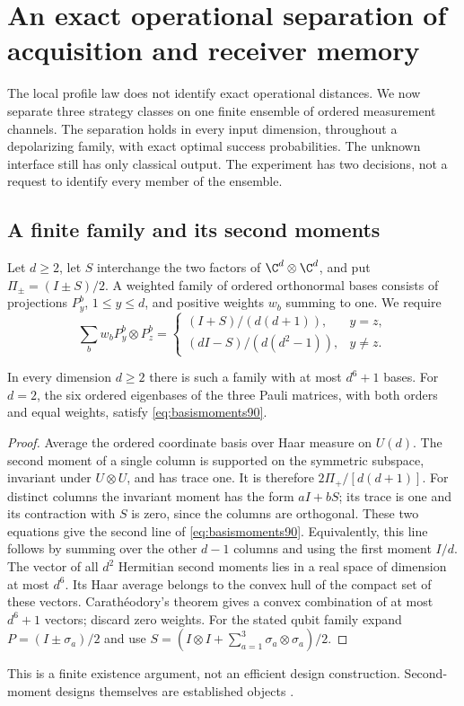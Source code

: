 \section{An exact operational separation of acquisition and receiver memory}
\label{sec:operationalmemory90}
The local profile law does not identify exact operational distances.
We now separate three strategy classes on one finite ensemble of ordered
measurement channels.  The separation holds in every input dimension,
throughout a depolarizing family, with exact optimal success probabilities.
The unknown interface still has only classical output.  The experiment
has two decisions, not a request to identify every member of the ensemble.

\subsection{A finite family and its second moments}
Let $d\ge2$, let $S$ interchange the two factors of $\C^d\otimes\C^d$,
and put $\Pi_\pm=(I\pm S)/2$.  A weighted family of ordered orthonormal
bases consists of projections $P_y^b$, $1\le y\le d$, and positive
weights $w_b$ summing to one.  We require
\begin{equation}\label{eq:basismoments90}
 \sum_b w_b P_y^b\otimes P_z^b=
 \begin{cases}
 (I+S)/(d(d+1)),&y=z,\\
 (dI-S)/(d(d^2-1)),&y\ne z.
 \end{cases}
\end{equation}
\begin{lemma}\label{lem:finitedesign90}
In every dimension $d\ge2$ there is such a family with at most $d^6+1$
bases.  For $d=2$, the six ordered eigenbases of the three Pauli matrices,
with both orders and equal weights, satisfy \eqref{eq:basismoments90}.
\end{lemma}
\begin{proof}
Average the ordered coordinate basis over Haar measure on $U(d)$.
The second moment of a single column is supported on the symmetric
subspace, invariant under $U\otimes U$, and has trace one.  It is
therefore $2\Pi_+/[d(d+1)]$.  For distinct columns the invariant moment
has the form $aI+bS$; its trace is one and its contraction with $S$ is
zero, since the columns are orthogonal.  These two equations give the
second line of \eqref{eq:basismoments90}.  Equivalently, this line follows
by summing over the other $d-1$ columns and using the first moment $I/d$.
The vector of all $d^2$ Hermitian second moments lies in a real space of
dimension at most $d^6$.  Its Haar average belongs to the convex hull
of the compact set of these vectors.  Carath\'eodory's theorem gives a
convex combination of at most $d^6+1$ vectors; discard zero weights.
For the stated qubit family expand $P=(I\pm\sigma_a)/2$ and use
$S=(I\otimes I+\sum_{a=1}^3\sigma_a\otimes\sigma_a)/2$.
\end{proof}
This is a finite existence argument, not an efficient design construction.
Second-moment designs themselves are established objects \cite{GAE90}.

